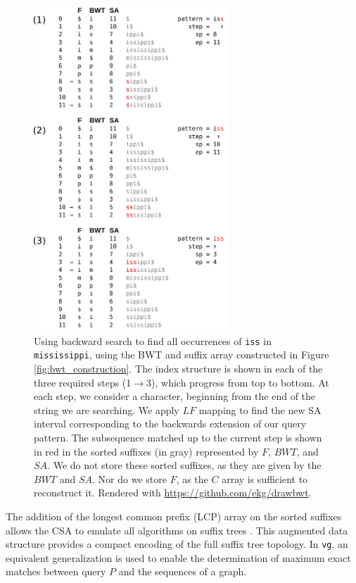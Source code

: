 \begin{figure}[htbp!]
  \centering
  \includegraphics[width=0.65\textwidth]{Chapter2/Figs/mississippi_iss_search.pdf}
  \caption[Backward search in the BWT and suffix array]{
    Using backward search to find all occurrences of {\tt iss} in {\tt mississippi}, using the BWT and suffix array constructed in Figure \ref{fig:bwt_construction}.
    The index structure is shown in each of the three required steps (1$\to$3), which progress from top to bottom.
    At each step, we consider a character, beginning from the end of the string we are searching.
    We apply $LF$ mapping to find the new SA interval corresponding to the backwards extension of our query pattern.
    The subsequence matched up to the current step is shown in red in the sorted suffixes (in gray) represented by $F$, $BWT$, and $SA$.
    We do not store these sorted suffixes, as they are given by the $BWT$ and $SA$.
    Nor do we store $F$, as the $C$ array is sufficient to reconstruct it.
    Rendered with \url{https://github.com/ekg/drawbwt}.
  }
  \label{fig:bwt_search}
\end{figure}

The addition of the longest common prefix (LCP) array on the sorted suffixes allows the CSA to emulate all algorithms on suffix trees \cite{abouelhoda2004replacing}.
This augmented data structure provides a compact encoding of the full suffix tree topology.
In {\tt vg}, an equivalent generalization is used to enable the determination of maximum exact matches between query $P$ and the sequences of a graph.


